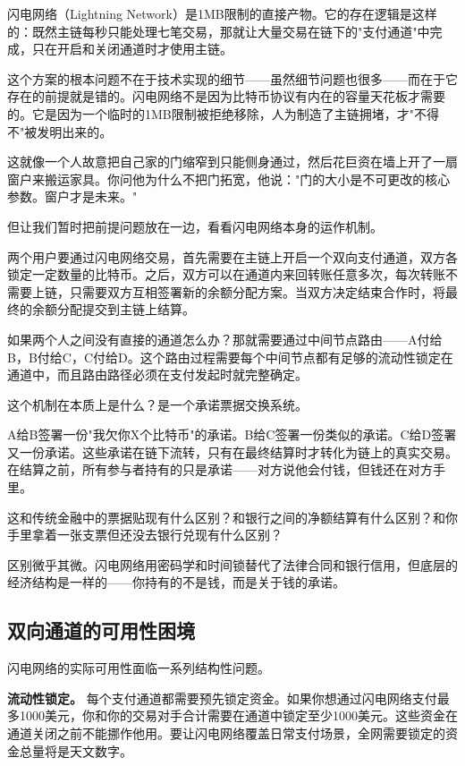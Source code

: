 \documentclass[a4paper,12pt,openany]{ctexbook}
\begin{document}
闪电网络（Lightning Network）是1MB限制的直接产物。它的存在逻辑是这样的：既然主链每秒只能处理七笔交易，那就让大量交易在链下的"支付通道"中完成，只在开启和关闭通道时才使用主链。

这个方案的根本问题不在于技术实现的细节——虽然细节问题也很多——而在于它存在的前提就是错的。闪电网络不是因为比特币协议有内在的容量天花板才需要的。它是因为一个临时的1MB限制被拒绝移除，人为制造了主链拥堵，才"不得不"被发明出来的。

这就像一个人故意把自己家的门缩窄到只能侧身通过，然后花巨资在墙上开了一扇窗户来搬运家具。你问他为什么不把门拓宽，他说："门的大小是不可更改的核心参数。窗户才是未来。"

但让我们暂时把前提问题放在一边，看看闪电网络本身的运作机制。

两个用户要通过闪电网络交易，首先需要在主链上开启一个双向支付通道，双方各锁定一定数量的比特币。之后，双方可以在通道内来回转账任意多次，每次转账不需要上链，只需要双方互相签署新的余额分配方案。当双方决定结束合作时，将最终的余额分配提交到主链上结算。

如果两个人之间没有直接的通道怎么办？那就需要通过中间节点路由——A付给B，B付给C，C付给D。这个路由过程需要每个中间节点都有足够的流动性锁定在通道中，而且路由路径必须在支付发起时就完整确定。

这个机制在本质上是什么？是一个承诺票据交换系统。

A给B签署一份"我欠你X个比特币"的承诺。B给C签署一份类似的承诺。C给D签署又一份承诺。这些承诺在链下流转，只有在最终结算时才转化为链上的真实交易。在结算之前，所有参与者持有的只是承诺——对方说他会付钱，但钱还在对方手里。

这和传统金融中的票据贴现有什么区别？和银行之间的净额结算有什么区别？和你手里拿着一张支票但还没去银行兑现有什么区别？

区别微乎其微。闪电网络用密码学和时间锁替代了法律合同和银行信用，但底层的经济结构是一样的——你持有的不是钱，而是关于钱的承诺。


\subsection*{双向通道的可用性困境}


闪电网络的实际可用性面临一系列结构性问题。

\textbf{流动性锁定。} 每个支付通道都需要预先锁定资金。如果你想通过闪电网络支付最多1000美元，你和你的交易对手合计需要在通道中锁定至少1000美元。这些资金在通道关闭之前不能挪作他用。要让闪电网络覆盖日常支付场景，全网需要锁定的资金总量将是天文数字。
\end{document}
